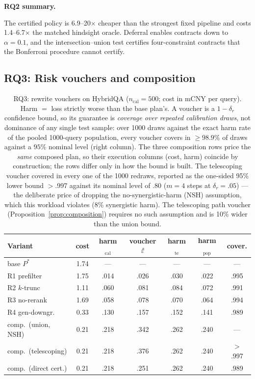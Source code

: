 \smallskip\noindent\textbf{RQ2 summary.}\par
The certified policy is 6.9--20$\times$ cheaper than the strongest
fixed pipeline and costs 1.4--6.7$\times$ the matched hindsight oracle.
Deferral enables contracts down to $\alpha=0.1$, and the
intersection--union test certifies four-constraint contracts that the
Bonferroni procedure cannot certify.

\subsection{RQ3: Risk vouchers and composition}
\label{sec:exp-rewrites}

\begin{table}
\caption{RQ3: rewrite vouchers on HybridQA
($n_{\mathrm{cal}} = 500$; cost in mCNY per query). Harm $=$ loss
strictly worse than the base
plan's. A voucher is a $1-\delta_r$ confidence bound, so its
guarantee is \emph{coverage over repeated calibration draws}, not
dominance of any single test sample: over 1000 draws against the exact
harm rate of the pooled 1000-query population, every voucher covers in
$\ge 98.9\%$ of draws against a $95\%$ nominal level (right column).
The three composition rows price the \emph{same} composed plan, so
their execution columns (cost, harm) coincide by construction; the
rows differ only in how the bound is built. The telescoping voucher
covered in every one of the 1000 redraws, reported as the one-sided
95\% lower bound $>$.997 against its nominal
level of $.80$ ($m = 4$ steps at $\delta_r = .05$) --- the deliberate
price of dropping the no-synergistic-harm (NSH)
assumption, which this workload violates (8\% synergistic harm). The
telescoping path voucher (Proposition~\ref{prop:composition}) requires
no such assumption and is 10\% wider than the union bound.}
\label{tab:rewrites}
\centering
\setlength{\tabcolsep}{1.5pt}\scriptsize
\begin{tabular*}{\tblwidth}{@{}l@{\extracolsep{\fill}}cccccc@{}}
\toprule
Variant & cost & harm$_{\mathrm{cal}}$ & voucher $\hat{\varepsilon}$
& harm$_{\mathrm{te}}$ & harm$_{\mathrm{pop}}$ & cover. \\
\midrule
base $P^\ast$    & 1.74 & ---  & ---  & ---  & --- & --- \\
R1 prefilter     & 1.75 & .014 & .026 & .030 & .022 & .995 \\
R2 $k$-trunc     & 1.11 & .060 & .081 & .084 & .072 & .991 \\
R3 no-rerank     & 1.69 & .058 & .078 & .070 & .064 & .994 \\
R4 gen-downgr.   & 0.33 & .130 & .157 & .152 & .141 & .989 \\
\midrule
comp.\ (union, NSH)   & 0.21 & .218 & .342 & .262 & .240 & --- \\
comp.\ (telescoping)  & 0.21 & .218 & .376 & .262 & .240 & $>$.997 \\
comp.\ (direct cert.) & 0.21 & .218 & .251 & .262 & .240 & .989 \\
\bottomrule
\end{tabular*}
\end{table}

